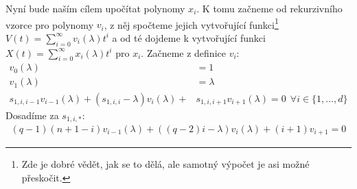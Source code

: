 Nyní bude naším cílem upočítat polynomy $x_i$. K tomu začneme od rekurzivního vzorce
pro polynomy $v_i$, z něj spočteme jejich vytvořující funkci\footnote{
Zde je dobré vědět, jak se to dělá, ale samotný výpočet je asi možné přeskočit.
}
$V(t) = \sum_{i = 0}^\infty v_i(\lambda) t^i$ a od té dojdeme
k vytvořující funkci $X(t) = \sum_{i = 0}^\infty x_i(\lambda) t^i$ pro $x_i$.
Začneme z definice $v_i$:
\begin{align}
	v_0(\lambda) &= 1 \\
	v_1(\lambda) &= \lambda \\
	s_{1,i,i-1}v_{i-1}(\lambda) + (s_{1,i,i} -\lambda) v_i(\lambda) +
    &s_{1,i,i+1}v_{i+1}(\lambda) = 0 \ \ \forall i \in \{1, \ldots, d\}
\end{align}
Dosadíme za $s_{1,i,*}$:
\begin{align}
  (q-1)(n + 1 - i)v_{i-1}(\lambda) + ((q-2)i - \lambda)v_i(\lambda) +
    (i+1) v_{i+1} = 0
\end{align}

